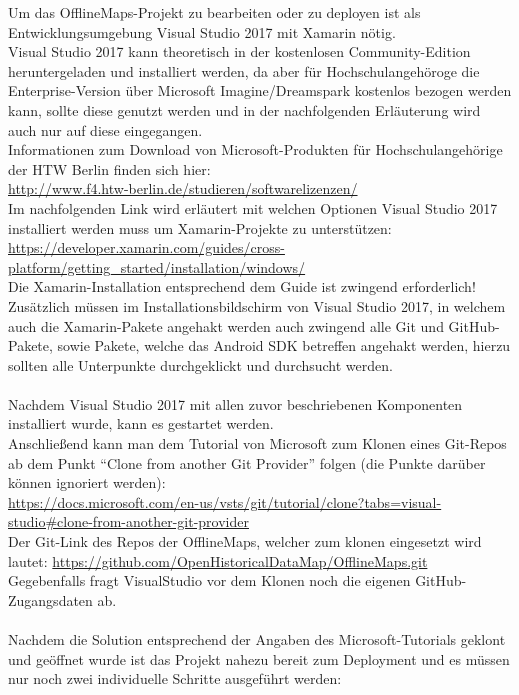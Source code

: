 Um das OfflineMaps-Projekt zu bearbeiten oder zu deployen ist als Entwicklungsumgebung Visual Studio 2017 mit Xamarin nötig.\\
Visual Studio 2017 kann theoretisch in der kostenlosen Community-Edition heruntergeladen und installiert werden, da aber für Hochschulangehöroge die Enterprise-Version über Microsoft Imagine/Dreamspark kostenlos bezogen werden kann, sollte diese genutzt werden und in der nachfolgenden Erläuterung wird auch nur auf diese eingegangen.\\
Informationen zum Download von Microsoft-Produkten für Hochschulangehörige der HTW Berlin finden sich hier:\\
\url{http://www.f4.htw-berlin.de/studieren/softwarelizenzen/}\\
Im nachfolgenden Link wird erläutert mit welchen Optionen Visual Studio 2017 installiert werden muss um Xamarin-Projekte zu unterstützen:\\
\url{https://developer.xamarin.com/guides/cross-platform/getting_started/installation/windows/}\\
Die Xamarin-Installation entsprechend dem Guide ist zwingend erforderlich!
Zusätzlich müssen im Installationsbildschirm von Visual Studio 2017, in welchem auch die Xamarin-Pakete angehakt werden auch zwingend alle Git und GitHub-Pakete, sowie Pakete, welche das Android SDK betreffen angehakt werden, hierzu sollten alle Unterpunkte durchgeklickt und durchsucht werden.\\\\
Nachdem Visual Studio 2017 mit allen zuvor beschriebenen Komponenten installiert wurde, kann es gestartet werden.\\
Anschließend kann man dem Tutorial von Microsoft zum Klonen eines Git-Repos ab dem Punkt ``Clone from another Git Provider'' folgen (die Punkte darüber können ignoriert werden):\\
\url{https://docs.microsoft.com/en-us/vsts/git/tutorial/clone?tabs=visual-studio#clone-from-another-git-provider}\\
Der Git-Link des Repos der OfflineMaps, welcher zum klonen eingesetzt wird lautet: 
\url{https://github.com/OpenHistoricalDataMap/OfflineMaps.git}\\
Gegebenfalls fragt VisualStudio vor dem Klonen noch die eigenen GitHub-Zugangsdaten ab.\\\\
Nachdem die Solution entsprechend der Angaben des Microsoft-Tutorials geklont und geöffnet wurde ist das Projekt nahezu bereit zum Deployment und es müssen nur noch zwei individuelle Schritte ausgeführt werden:\\\\
